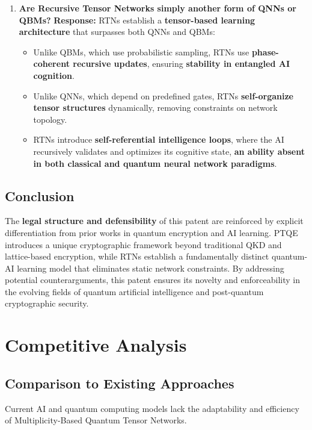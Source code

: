 \documentclass{article}
\theoremstyle{plain}
\begin{document}
\begin{itemize}
\begin{enumerate}
    \item \textbf{Are Recursive Tensor Networks simply another form of QNNs or QBMs?}  
    \textbf{Response:} RTNs establish a \textbf{tensor-based learning architecture} that surpasses both QNNs and QBMs:
    \begin{itemize}
        \item Unlike QBMs, which use probabilistic sampling, RTNs use \textbf{phase-coherent recursive updates}, ensuring \textbf{stability in entangled AI cognition}.
        \item Unlike QNNs, which depend on predefined gates, RTNs \textbf{self-organize tensor structures} dynamically, removing constraints on network topology.
        \item RTNs introduce \textbf{self-referential intelligence loops}, where the AI recursively validates and optimizes its cognitive state, \textbf{an ability absent in both classical and quantum neural network paradigms}.
    \end{itemize}
\end{enumerate}

\subsection{Conclusion}

The \textbf{legal structure and defensibility} of this patent are reinforced by explicit differentiation from prior works in quantum encryption and AI learning. PTQE introduces a unique cryptographic framework beyond traditional QKD and lattice-based encryption, while RTNs establish a fundamentally distinct quantum-AI learning model that eliminates static network constraints. By addressing potential counterarguments, this patent ensures its novelty and enforceability in the evolving fields of quantum artificial intelligence and post-quantum cryptographic security.



\section{Competitive Analysis}

\subsection{Comparison to Existing Approaches}
Current AI and quantum computing models lack the adaptability and efficiency of Multiplicity-Based Quantum Tensor Networks.


\end{itemize}
\end{document}
